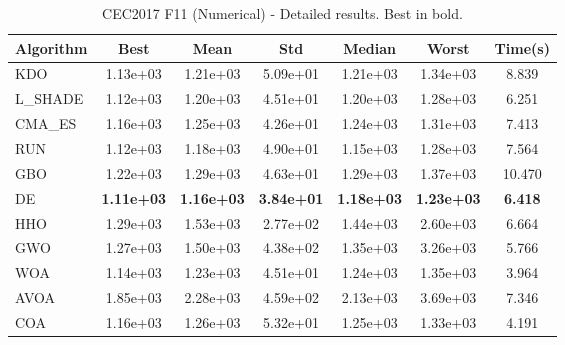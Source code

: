 \begin{table}[H]
\centering\small
\caption{CEC2017 F11 (Numerical) - Detailed results. Best in bold.}
\label{tab:cec2017_F11}
\begin{tabular}{lcccccc}
\toprule
\textbf{Algorithm} & \textbf{Best} & \textbf{Mean} & \textbf{Std} & \textbf{Median} & \textbf{Worst} & \textbf{Time(s)} \\
\midrule
KDO & 1.13e+03 & 1.21e+03 & 5.09e+01 & 1.21e+03 & 1.34e+03 & 8.839 \\
L_SHADE & 1.12e+03 & 1.20e+03 & 4.51e+01 & 1.20e+03 & 1.28e+03 & 6.251 \\
CMA_ES & 1.16e+03 & 1.25e+03 & 4.26e+01 & 1.24e+03 & 1.31e+03 & 7.413 \\
RUN & 1.12e+03 & 1.18e+03 & 4.90e+01 & 1.15e+03 & 1.28e+03 & 7.564 \\
GBO & 1.22e+03 & 1.29e+03 & 4.63e+01 & 1.29e+03 & 1.37e+03 & 10.470 \\
DE & \textbf{1.11e+03} & \textbf{1.16e+03} & \textbf{3.84e+01} & \textbf{1.18e+03} & \textbf{1.23e+03} & \textbf{6.418} \\
HHO & 1.29e+03 & 1.53e+03 & 2.77e+02 & 1.44e+03 & 2.60e+03 & 6.664 \\
GWO & 1.27e+03 & 1.50e+03 & 4.38e+02 & 1.35e+03 & 3.26e+03 & 5.766 \\
WOA & 1.14e+03 & 1.23e+03 & 4.51e+01 & 1.24e+03 & 1.35e+03 & 3.964 \\
AVOA & 1.85e+03 & 2.28e+03 & 4.59e+02 & 2.13e+03 & 3.69e+03 & 7.346 \\
COA & 1.16e+03 & 1.26e+03 & 5.32e+01 & 1.25e+03 & 1.33e+03 & 4.191 \\
\bottomrule
\end{tabular}
\end{table}
